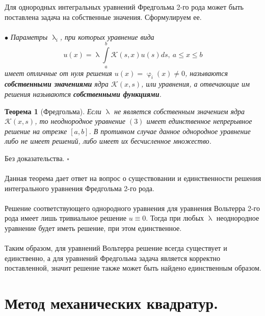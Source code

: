 \documentclass[a4paper, 12pt]{report}
\numberwithin{equation}{section}
\newenvironment{Proof} %
{\par\noindent{$\blacklozenge$}} %
{\hfill$\scriptstyle\square$}
\renewcommand{\leq}{\leqslant}
\renewcommand{\varphi}{\upvarphi}
\renewcommand{\lambda}{\uplambda}
\newtheorem*{theorem}{Теорема}
\begin{document}
	Для однородных интегральных уравнений Фредгольма 2-го рода может быть поставлена задача на собственные значения. Сформулируем ее. \\\\
	$\bullet$ \textit{Параметры $\lambda_i$, при которых уравнение вида 
		\begin{equation}
			u(x) = \lambda\int\limits_a^b \mathcal K(s,x)u(s)ds,\ a\leq x \leq b
		\end{equation}
	имеет отличные от нуля решения $u(x) = \varphi_i(x)\ne 0$, называются \textbf{собственными значениями} ядра $\mathcal K(x,s)$, или уравнения, а отвечающие им решения называются \textbf{собственными функциями}.}
	\begin{theorem}
		[Фредгольма]
		Если $\lambda$ не является собственным значением ядра $\mathcal K(x,s)$, то неоднородное уравнение $(3)$ имеет единственное непрерывное решение на отрезке $[a,b]$. В противном случае данное однородное уравнение либо не имеет решений, либо имеет их бесчисленное множество. 
	\end{theorem}
	\begin{Proof}
		Без доказательства.
	\end{Proof}\\\\
	Данная теорема дает ответ на вопрос о существовании и единственности решения интегрального уравнения Фредгольма 2-го рода.\\\\
	Решение соответствующего однородного уравнения для уравнения Вольтерра 2-го рода имеет лишь тривиальное решение $u \equiv 0$. Тогда при любых $\lambda$ неоднородное уравнение будет иметь решение, при этом единственное.\\\\
	Таким образом, для уравнений Вольтерра решение всегда существует и единственно, а для уравнений Фредгольма задача является корректно поставленной, значит решение также может быть найдено единственным образом.
	\section{Метод механических квадратур.}
\end{document}
